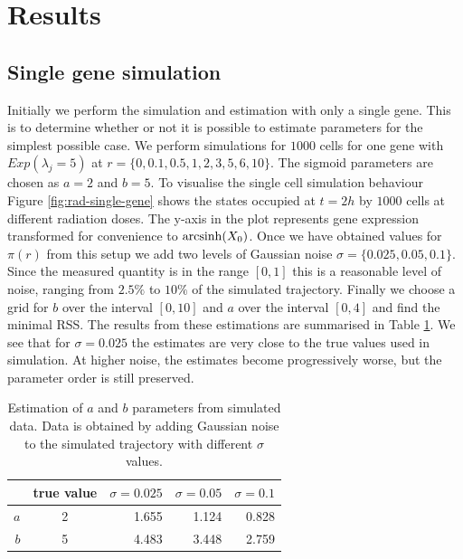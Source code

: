\section{Results}
\label{sec:results-cc}

\subsection{Single gene simulation}
\label{sec:single-gene-simul}

Initially we perform the simulation and estimation with only a single gene. This is to determine whether or not it is possible to estimate parameters for the simplest possible case. We perform simulations for $1000$ cells for one gene with $Exp(\lambda_j = 5)$ at $r = \lbrace 0, 0.1, 0.5, 1, 2, 3, 5, 6, 10 \rbrace$. The sigmoid parameters are chosen as $a = 2$ and $b = 5$. To visualise the single cell simulation behaviour Figure \ref{fig:rad-single-gene} shows the states occupied at $t = 2h$ by $1000$ cells at different radiation doses. The y-axis in the plot represents gene expression transformed for convenience to $\operatorname{arcsinh}(X_0)$. Once we have obtained values for $\pi(r)$ from this setup we add two levels of Gaussian noise $\sigma = \lbrace 0.025, 0.05, 0.1 \rbrace$. Since the measured quantity is in the range $[0, 1]$ this is a reasonable level of noise, ranging from $2.5 \%$ to $10 \%$ of the simulated trajectory. Finally we choose a grid for $b$ over the interval $[0, 10]$ and $a$ over the interval $[0, 4]$ and find the minimal RSS. The results from these estimations are summarised in Table \ref{tab:fit-cc-single}. We see that for $\sigma = 0.025$ the estimates are very close to the true values used in simulation. At higher noise, the estimates become progressively worse, but the parameter order is still preserved.

\begin{table}[!t]
    \centering
\begin{tabular}{r||c|rrr}
  \hline \hline
   & true value & $\sigma = 0.025$ & $\sigma = 0.05$ & $\sigma = 0.1$ \\
  \hline
  $a$ & 2 & 1.655 & 1.124 & 0.828 \\
  $b$ & 5 & 4.483 & 3.448 & 2.759 \\
   \hline
 \end{tabular}
 \caption{Estimation of $a$ and $b$ parameters from simulated data. Data is obtained by adding Gaussian noise to the simulated trajectory with different $\sigma$ values. }
 \label{tab:fit-cc-single}
\end{table}

